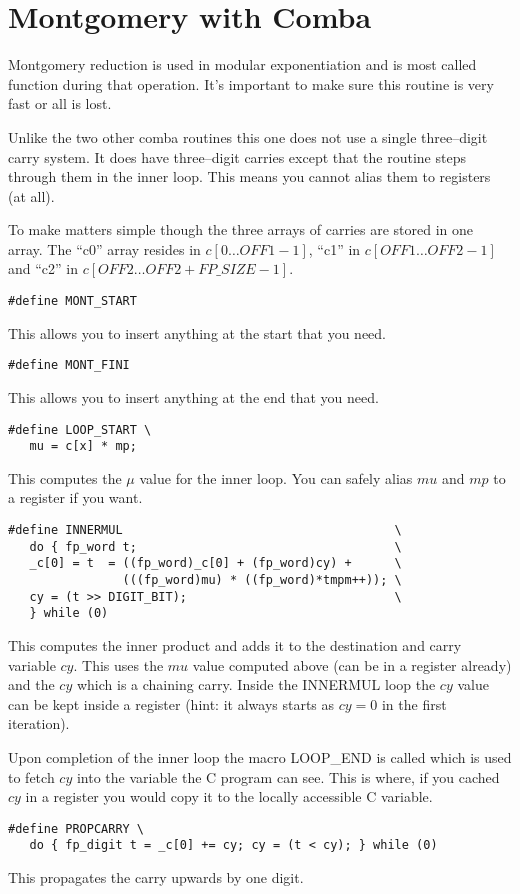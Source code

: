 \documentclass[b5paper]{book}
\begin{document}
\section{Montgomery with Comba}
Montgomery reduction is used in modular exponentiation and is most called function during
that operation.  It's important to make sure this routine is very fast or all is lost.

Unlike the two other comba routines this one does not use a single three--digit carry 
system.  It does have three--digit carries except that the routine steps through them
in the inner loop.  This means you cannot alias them to registers (at all).

To make matters simple though the three arrays of carries are stored in one array.  The 
``c0'' array resides in $c[0 \ldots OFF1-1]$, ``c1'' in $c[OFF1 \ldots OFF2-1]$ and ``c2'' in
$c[OFF2 \ldots OFF2+FP\_SIZE-1]$.  

\begin{verbatim}
#define MONT_START 
\end{verbatim}

This allows you to insert anything at the start that you need.

\begin{verbatim}
#define MONT_FINI
\end{verbatim}

This allows you to insert anything at the end that you need.

\begin{verbatim}
#define LOOP_START \
   mu = c[x] * mp;
\end{verbatim}

This computes the $\mu$ value for the inner loop.  You can safely alias $mu$ and $mp$ to
a register if you want.

\begin{verbatim}
#define INNERMUL                                      \
   do { fp_word t;                                    \
   _c[0] = t  = ((fp_word)_c[0] + (fp_word)cy) +      \
                (((fp_word)mu) * ((fp_word)*tmpm++)); \
   cy = (t >> DIGIT_BIT);                             \
   } while (0)
\end{verbatim}

This computes the inner product and adds it to the destination and carry variable $cy$.
This uses the $mu$ value computed above (can be in a register already) and the 
$cy$ which is a chaining carry.  Inside the INNERMUL loop the $cy$ value can be kept
inside a register (hint: it always starts as $cy = 0$ in the first iteration).

Upon completion of the inner loop the macro LOOP\_END is called which is used to fetch
$cy$ into the variable the C program can see.  This is where, if you cached $cy$ in a
register you would copy it to the locally accessible C variable.

\begin{verbatim}
#define PROPCARRY \
   do { fp_digit t = _c[0] += cy; cy = (t < cy); } while (0)
\end{verbatim}

This propagates the carry upwards by one digit.  


\end{document}
